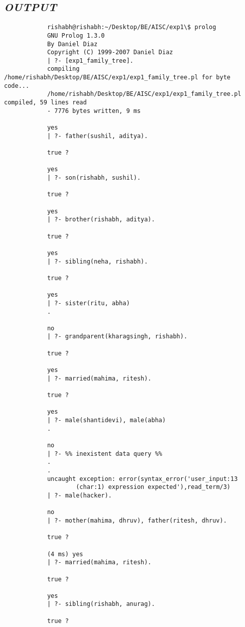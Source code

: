 \documentclass{article}
\begin{document}
\begin{titlepage}
        \section{\textbf{\textit{OUTPUT}}}
        \begin{verbatim}
            rishabh@rishabh:~/Desktop/BE/AISC/exp1\$ prolog
            GNU Prolog 1.3.0
            By Daniel Diaz
            Copyright (C) 1999-2007 Daniel Diaz
            | ?- [exp1_family_tree].
            compiling /home/rishabh/Desktop/BE/AISC/exp1/exp1_family_tree.pl for byte code...
            /home/rishabh/Desktop/BE/AISC/exp1/exp1_family_tree.pl compiled, 59 lines read 
            - 7776 bytes written, 9 ms

            yes
            | ?- father(sushil, aditya).

            true ? 

            yes
            | ?- son(rishabh, sushil).

            true ? 

            yes
            | ?- brother(rishabh, aditya).

            true ? 

            yes
            | ?- sibling(neha, rishabh).

            true ? 

            yes
            | ?- sister(ritu, abha)
            .

            no
            | ?- grandparent(kharagsingh, rishabh).

            true ? 

            yes
            | ?- married(mahima, ritesh).

            true ? 

            yes
            | ?- male(shantidevi), male(abha)
            .

            no
            | ?- %% inexistent data query %%
            .
            .
            uncaught exception: error(syntax_error('user_input:13 
                    (char:1) expression expected'),read_term/3)
            | ?- male(hacker).

            no
            | ?- mother(mahima, dhruv), father(ritesh, dhruv).

            true ? 

            (4 ms) yes
            | ?- married(mahima, ritesh).

            true ? 

            yes
            | ?- sibling(rishabh, anurag).

            true ? 
        \end{verbatim}
    \end{titlepage}
\end{document}
